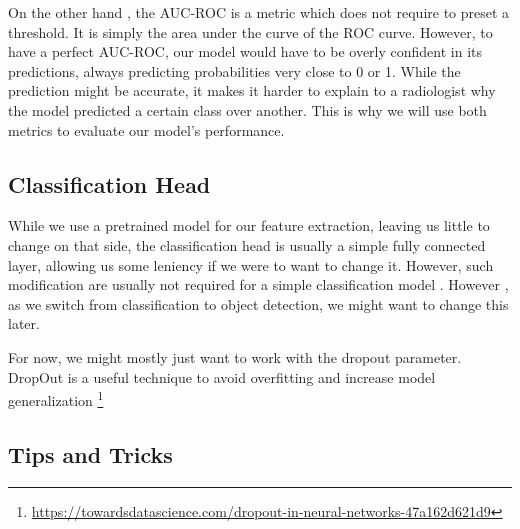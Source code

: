 \documentclass[11pt]{article}
\begin{document}
        On the other hand , the AUC-ROC is a metric which does not require to preset a threshold. It is simply the area under the curve of the ROC curve.
        However, to have a perfect AUC-ROC, our model would have to be overly confident in its predictions, always
        predicting probabilities very close to 0 or 1. While the prediction might be accurate, it makes it harder to
        explain to a radiologist why the model predicted a certain class over another. This is why we will use both
        metrics to evaluate our model's performance.


    \subsection{Classification Head}

        While we use a pretrained model for our feature extraction, leaving us little to change on that side, the classification head is usually a simple fully connected
        layer, allowing us some leniency if we were to want to change it. However, such modification are usually not required for a simple classification model . However , as we switch
        from  classification to object detection, we might want to change this later.

        For now, we might mostly just want to work with the dropout parameter. DropOut is a useful technique to avoid overfitting and increase model
        generalization \footnote{\url{https://towardsdatascience.com/dropout-in-neural-networks-47a162d621d9}}

    \subsection{Tips and Tricks}
\end{document}
